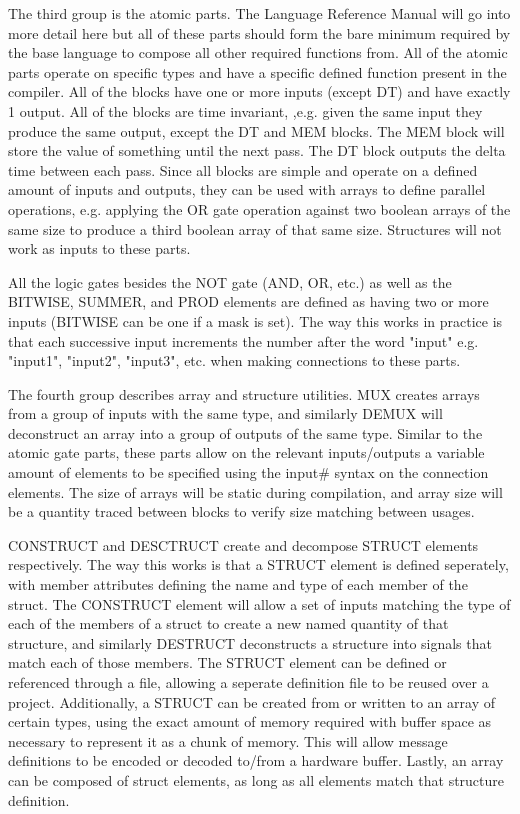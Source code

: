 The third group is the atomic parts. The Language Reference Manual will go
into more detail here but all of these parts should form the bare minimum 
required by the base language to compose all other required functions from.
All of the atomic parts operate on specific types and have a specific defined
function present in the compiler. All of the blocks have one or more inputs
(except DT) and have exactly 1 output. All of the blocks are time invariant,
,e.g. given the same input they produce the same output, except the DT
and MEM blocks. The MEM block will store the value of something until the next
pass. The DT block outputs the delta time between each pass. Since all blocks
are simple and operate on a defined amount of inputs and outputs, they can be
used with arrays to define parallel operations, e.g. applying the OR gate
operation against two boolean arrays of the same size to produce a third boolean
array of that same size. Structures will not work as inputs to these parts.

All the logic gates besides the NOT gate (AND, OR, etc.) as well as the BITWISE,
SUMMER, and PROD elements are defined as having two or more inputs (BITWISE can
be one if a mask is set). The way this works in practice is that each successive
input increments the number after the word "input" e.g. "input1", "input2",
"input3", etc. when making connections to these parts.

The fourth group describes array and structure utilities. MUX creates arrays from
a group of inputs with the same type, and similarly DEMUX will deconstruct an
array into a group of outputs of the same type. Similar to the atomic gate parts,
these parts allow on the relevant inputs/outputs a variable amount of elements
to be specified using the input\# syntax on the connection elements. The size of
arrays will be static during compilation, and array size will be a quantity traced
between blocks to verify size matching between usages.

CONSTRUCT and DESCTRUCT create and decompose STRUCT elements respectively. The
way this works is that a STRUCT element is defined seperately, with member
attributes defining the name and type of each member of the struct. The CONSTRUCT
element will allow a set of inputs matching the type of each of the members of a
struct to create a new named quantity of that structure, and similarly DESTRUCT
deconstructs a structure into signals that match each of those members. The STRUCT
element can be defined or referenced through a file, allowing a seperate definition
file to be reused over a project. Additionally, a STRUCT can be created from or written
to an array of certain types, using the exact amount of memory required with buffer
space as necessary to represent it as a chunk of memory. This will allow message
definitions to be encoded or decoded to/from a hardware buffer. Lastly, an array
can be composed of struct elements, as long as all elements match that structure
definition.

